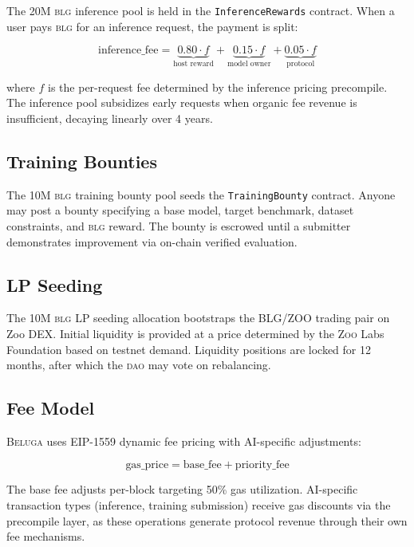 \documentclass[11pt,letterpaper]{article}
\newcommand{\Zoo}{\textsc{Zoo}}
\newcommand{\Beluga}{\textsc{Beluga}}
\newcommand{\BLG}{\textsc{blg}}
\newcommand{\DAO}{\textsc{dao}}
\begin{document}
The 20M \BLG{} inference pool is held in the \texttt{InferenceRewards} contract. When a user pays \BLG{} for an inference request, the payment is split:

\begin{equation}
\text{inference\_fee} = \underbrace{0.80 \cdot f}_{\text{host reward}} + \underbrace{0.15 \cdot f}_{\text{model owner}} + \underbrace{0.05 \cdot f}_{\text{protocol}}
\end{equation}

where $f$ is the per-request fee determined by the inference pricing precompile. The inference pool subsidizes early requests when organic fee revenue is insufficient, decaying linearly over 4 years.

\subsection{Training Bounties}

The 10M \BLG{} training bounty pool seeds the \texttt{TrainingBounty} contract. Anyone may post a bounty specifying a base model, target benchmark, dataset constraints, and \BLG{} reward. The bounty is escrowed until a submitter demonstrates improvement via on-chain verified evaluation.

\subsection{LP Seeding}

The 10M \BLG{} LP seeding allocation bootstraps the BLG/ZOO trading pair on Zoo DEX. Initial liquidity is provided at a price determined by the \Zoo{} Labs Foundation based on testnet demand. Liquidity positions are locked for 12 months, after which the \DAO{} may vote on rebalancing.

\subsection{Fee Model}

\Beluga{} uses EIP-1559 dynamic fee pricing with AI-specific adjustments:

\begin{equation}
\text{gas\_price} = \text{base\_fee} + \text{priority\_fee}
\end{equation}

The base fee adjusts per-block targeting 50\% gas utilization. AI-specific transaction types (inference, training submission) receive gas discounts via the precompile layer, as these operations generate protocol revenue through their own fee mechanisms.
\end{document}
